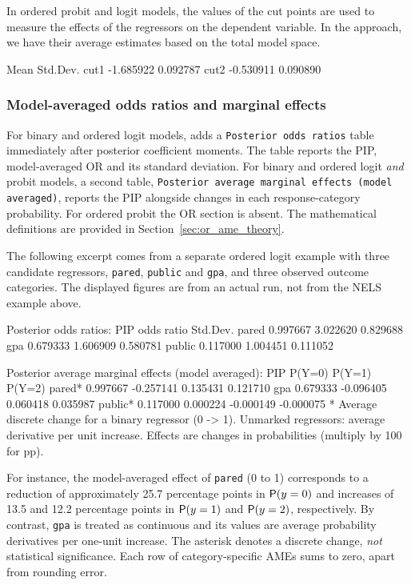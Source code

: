 In ordered probit and logit models, the values of the
cut points are used to measure the effects of the
regressors on the dependent variable. In the 
approach, we have their average estimates based on
the total model space.
\begin{CodeChunk}
\begin{CodeOutput}
                Mean       Std.Dev.
cut1       -1.685922       0.092787
cut2       -0.530911       0.090890
\end{CodeOutput}
\end{CodeChunk}


\subsubsection{Model-averaged odds ratios and marginal effects}
\label{sec:or_ame_output}
For binary and ordered logit models, 
adds a \texttt{Posterior odds ratios} table immediately after
posterior coefficient moments. The table reports the PIP,
model-averaged OR and its standard deviation. For binary and
ordered logit \emph{and} probit models, a second table,
\texttt{Posterior average marginal effects (model averaged)},
reports the PIP alongside changes in each response-category
probability. For ordered probit the OR section is absent.
The mathematical definitions are provided in
Section~\ref{sec:or_ame_theory}.

The following excerpt comes from a separate ordered logit
example with three candidate regressors, \texttt{pared},
\texttt{public} and \texttt{gpa}, and three observed outcome
categories. The displayed figures are from an actual 
run, not from the NELS example above.
\begin{CodeChunk}\begin{CodeOutput}
Posterior odds ratios:
                   PIP     odds ratio       Std.Dev.
 pared        0.997667       3.022620       0.829688
   gpa        0.679333       1.606909       0.580781
public        0.117000       1.004451       0.111052

Posterior average marginal effects (model averaged):
                    PIP         P(Y=0)         P(Y=1)         P(Y=2)
 pared*        0.997667      -0.257141       0.135431       0.121710
    gpa        0.679333      -0.096405       0.060418       0.035987
public*        0.117000       0.000224      -0.000149      -0.000075
* Average discrete change for a binary regressor (0 -> 1).
  Unmarked regressors: average derivative per unit increase.
  Effects are changes in probabilities (multiply by 100 for pp).
\end{CodeOutput}
\end{CodeChunk}
For instance, the model-averaged effect of \texttt{pared}
(0 to 1) corresponds to a reduction of approximately
25.7 percentage points in $\mathsf{P}(y=0)$ and increases of
13.5 and 12.2 percentage points in $\mathsf{P}(y=1)$ and
$\mathsf{P}(y=2)$, respectively. By contrast, \texttt{gpa}
is treated as continuous and its values are average
probability derivatives per one-unit increase. The
asterisk denotes a discrete change, \emph{not} statistical
significance. Each row of category-specific AMEs sums to
zero, apart from rounding error.

